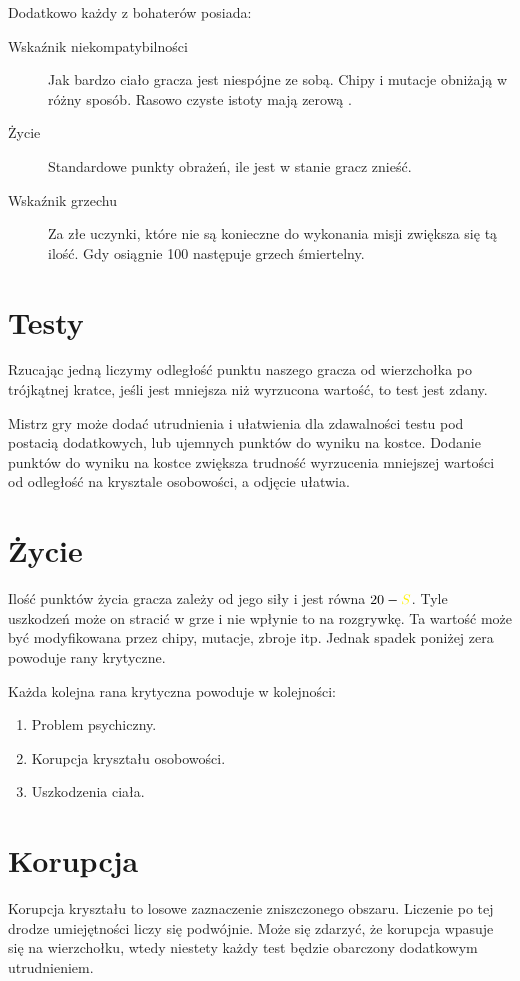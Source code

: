Dodatkowo każdy z bohaterów posiada:
\begin{description}
 \item [Wskaźnik niekompatybilności \abnkp] Jak bardzo ciało gracza jest niespójne ze sobą. Chipy i mutacje obniżają \abnkp w różny sposób. Rasowo czyste istoty mają zerową \abnkp.
 \item [Życie \abzyc] Standardowe punkty obrażeń, ile jest w stanie gracz znieść.
 \item [Wskaźnik grzechu \abgrz] Za złe uczynki, które nie są konieczne do wykonania misji zwiększa się tą ilość. Gdy osiągnie 100 następuje grzech śmiertelny.
\end{description}

\section{Testy}
Rzucając jedną \dxx liczymy odległość punktu naszego gracza od wierzchołka po trójkątnej kratce, jeśli jest mniejsza niż wyrzucona wartość, to test jest zdany.

Mistrz gry może dodać utrudnienia i ułatwienia dla zdawalności testu pod postacią dodatkowych, lub ujemnych punktów do wyniku na kostce.
Dodanie punktów do wyniku na kostce zwiększa trudność wyrzucenia mniejszej wartości od odległość na krysztale osobowości, a odjęcie ułatwia.

\section{Życie}
Ilość punktów życia gracza zależy od jego siły i jest równa $20 - \abs$.
Tyle uszkodzeń może on stracić w grze i nie wpłynie to na rozgrywkę.
Ta wartość może być modyfikowana przez chipy, mutacje, zbroje itp.
Jednak spadek poniżej zera powoduje rany krytyczne.

Każda kolejna rana krytyczna powoduje w kolejności:
\begin{enumerate}
\item Problem psychiczny.
\item Korupcja kryształu osobowości.
\item Uszkodzenia ciała.
\end{enumerate}

\section{Korupcja}
Korupcja kryształu to losowe zaznaczenie zniszczonego obszaru.
Liczenie po tej drodze umiejętności liczy się podwójnie.
Może się zdarzyć, że korupcja wpasuje się na wierzchołku, wtedy niestety każdy test będzie obarczony dodatkowym utrudnieniem.

